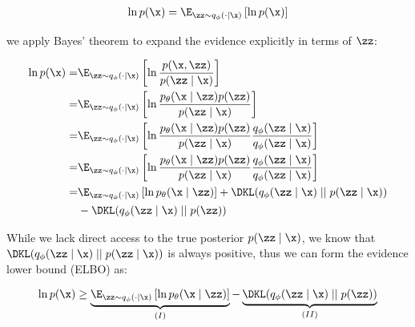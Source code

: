 \begin{equation}
  \begin{split}
    \ln{p(\x)}
    & =
    \E_{\zz \sim q_{\phi}(\cdot \mid \x)}
    \left[
      \ln p(\x)
      \right] \\
  \end{split}
\end{equation}

we apply Bayes' theorem to expand the evidence explicitly in terms of $\zz$:

\begin{equation}
  \begin{split}
    \ln{p(\x)}
    = &
    \E_{\zz \sim q_{\phi}(\cdot \mid \x)}
    \left[
      \ln \frac{p(\x, \zz)}{p(\zz \mid \x)}
      \right] \\
    = &
    \E_{\zz \sim q_{\phi}(\cdot \mid \x)}
    \left[
      \ln
      \frac
      {p_{\theta}(\x \mid \zz) p(\zz)}
      {p(\zz \mid \x)}
      \right] \\
    =&
    \E_{\zz \sim q_{\phi}(\cdot \mid \x)}
    \left[
      \ln
      \frac
      {p_{\theta}(\x \mid \zz) p(\zz)}
      {p(\zz \mid \x)}
      \frac
      {q_{\phi}(\zz \mid \x)}
      {q_{\phi}(\zz \mid \x)}
      \right] \\
    =&
    \E_{\zz \sim q_{\phi}(\cdot \mid \x)}
    \left[
      \ln
      \frac
      {p_{\theta}(\x \mid \zz) p(\zz)}
      {p(\zz \mid \x)}
      \frac
      {q_{\phi}(\zz \mid \x)}
      {q_{\phi}(\zz \mid \x)}
      \right] \\
    =&
    \E_{\zz \sim q_{\phi}(\cdot \mid \x)}
    \left[
      \ln
      {p_{\theta}(\x \mid \zz) }
      \right]
    + \DKL(q_{\phi}(\zz \mid \x)\mid \mid  p(\zz \mid \x))
    \\
    & - \DKL(q_{\phi}(\zz \mid \x)\mid \mid  p(\zz))
  \end{split}
\end{equation}

While we lack direct access to the true posterior $p(\zz \mid \x)$, we know that $\DKL(q_{\phi}(\zz \mid \x)\mid \mid  p(\zz \mid \x))$ is always positive, thus we can form the evidence lower bound (ELBO) as:

\begin{equation}
  \begin{split}
    \ln{p(\x)}
    \geq
    \underbrace{
      \E_{\zz \sim q_{\phi}(\cdot \mid \x)}
      \left[
        \ln
        {p_{\theta}(\x \mid \zz) }
        \right]}_{(I)}
    - \underbrace{
      \DKL(q_{\phi}(\zz \mid \x)\mid \mid  p(\zz))
    }_{(II)}
  \end{split}
\end{equation}

